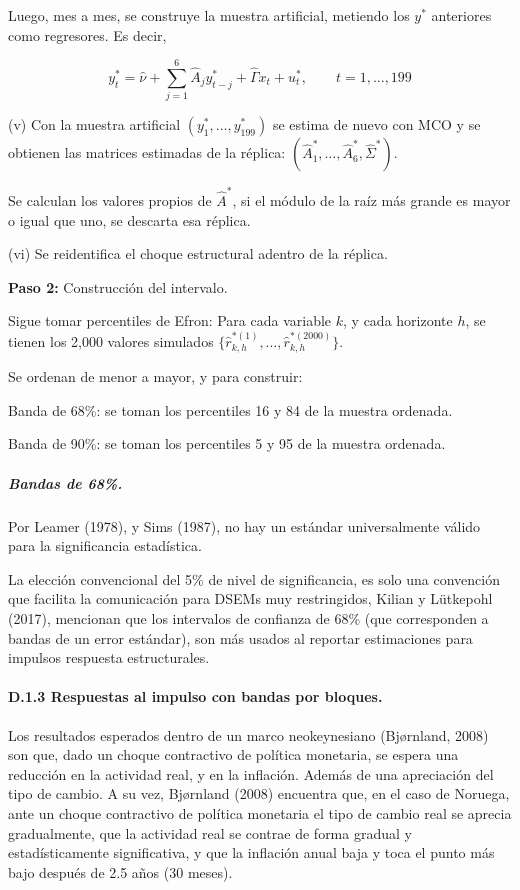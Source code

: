 \documentclass[12pt,letterpaper]{article}
\begin{document}
Luego, mes a mes, se construye la muestra artificial, metiendo los $y^*$ anteriores como regresores.
Es decir,

$$y_t^* = \hat{\nu} + \sum_{j=1}^6 \hat{A}_j y_{t-j}^* + \hat{\Gamma} x_t + u_t^*, \qquad t = 1, \dots, 199$$

(v) Con la muestra artificial $(y_1^*, \dots, y_{199}^*)$ se estima de nuevo con MCO y se obtienen las matrices estimadas de la réplica: $(\hat{A}_1^*, \dots, \hat{A}_6^*, \hat{\Sigma}^*)$.

Se calculan los valores propios de $\hat{A}^*$, si el módulo de la raíz más grande es mayor o igual que uno, se descarta esa réplica.

(vi) Se reidentifica el choque estructural adentro de la réplica.

\textbf{Paso 2:} Construcción del intervalo.

Sigue tomar percentiles de Efron: Para cada variable $k$, y cada horizonte $h$, se tienen los 2,000 valores simulados $\{\hat{r}_{k,h}^{*(1)}, \dots, \hat{r}_{k,h}^{*(2000)}\}$.

Se ordenan de menor a mayor, y para construir:

Banda de 68\%: se toman los percentiles 16 y 84 de la muestra ordenada.

Banda de 90\%: se toman los percentiles 5 y 95 de la muestra ordenada.

\subparagraph{Bandas de 68\%.}

Por Leamer (1978), y Sims (1987), no hay un estándar universalmente válido para la significancia estadística.

La elección convencional del 5\% de nivel de significancia, es solo una convención que facilita la comunicación para DSEMs muy restringidos, Kilian y Lütkepohl (2017), mencionan que los intervalos de confianza de 68\% (que corresponden a bandas de un error estándar), son más usados al reportar estimaciones para impulsos respuesta estructurales.


\paragraph{D.1.3 Respuestas al impulso con bandas por bloques.}

Los resultados esperados dentro de un marco neokeynesiano (Bj{\o}rnland, 2008) son que, dado un choque contractivo de política monetaria, se espera una reducción en la actividad real, y en la inflación. Además de una apreciación del tipo de cambio.
A su vez, Bj{\o}rnland (2008) encuentra que, en el caso de Noruega, ante un choque contractivo de política monetaria el tipo de cambio real se aprecia gradualmente, que la actividad real se contrae de forma gradual y estadísticamente significativa, y que la inflación anual baja y toca el punto más bajo después de 2.5 años (30 meses).
\end{document}
